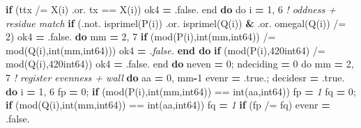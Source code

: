 \documentclass[10pt]{article}
\renewcommand{\_}{\origunderscore\allowbreak}
\newenvironment{Shaded}{}{}
\newcommand{\BuiltInTok}[1]{#1}
\newcommand{\CommentTok}[1]{\textit{#1}}
\newcommand{\ConstantTok}[1]{#1}
\newcommand{\DecValTok}[1]{#1}
\newcommand{\KeywordTok}[1]{\textbf{#1}}
\newcommand{\NormalTok}[1]{#1}
\newcommand{\OperatorTok}[1]{#1}
\begin{document}
\begin{Shaded}
\begin{Highlighting}[]
        \KeywordTok{if}\NormalTok{ (ttx }\OperatorTok{/=}\NormalTok{ X(i) }\OperatorTok{.or.}\NormalTok{ tx }\OperatorTok{==}\NormalTok{ X(i)) ok4 }\KeywordTok{=} \ConstantTok{.false.}
\BuiltInTok{     e}\NormalTok{nd }\KeywordTok{do}
\BuiltInTok{     d}\NormalTok{o i }\KeywordTok{=} \DecValTok{1}\NormalTok{, }\DecValTok{6}                                   \CommentTok{! oddness + residue match}
        \KeywordTok{if}\NormalTok{ (}\OperatorTok{.not.}\NormalTok{ isprime\_l(P(i)) }\OperatorTok{.or.}\NormalTok{ isprime\_l(Q(i)) }\KeywordTok{\&}
             \OperatorTok{.or.}\NormalTok{ omega\_l(Q(i)) }\OperatorTok{/=} \DecValTok{2}\NormalTok{) ok4 }\KeywordTok{=} \ConstantTok{.false.}
        \KeywordTok{do}\NormalTok{ mm }\KeywordTok{=} \DecValTok{2}\NormalTok{, }\DecValTok{7}
           \KeywordTok{if}\NormalTok{ (}\BuiltInTok{mod}\NormalTok{(P(i),}\BuiltInTok{int}\NormalTok{(mm,int64)) }\OperatorTok{/=} \BuiltInTok{mod}\NormalTok{(Q(i),}\BuiltInTok{int}\NormalTok{(mm,int64))) ok4 }\KeywordTok{=}\CommentTok{ .false.}
        \KeywordTok{end do}
        \KeywordTok{if}\NormalTok{ (}\BuiltInTok{mod}\NormalTok{(P(i),}\DecValTok{420\_int64}\NormalTok{) }\OperatorTok{/=} \BuiltInTok{mod}\NormalTok{(Q(i),}\DecValTok{420\_int64}\NormalTok{)) ok4 }\KeywordTok{=} \ConstantTok{.false.}
\BuiltInTok{     e}\NormalTok{nd }\KeywordTok{do}
\BuiltInTok{     n}\NormalTok{\_even }\KeywordTok{=} \DecValTok{0}\NormalTok{; n\_deciding }\KeywordTok{=} \DecValTok{0}
\BuiltInTok{     d}\NormalTok{o mm }\KeywordTok{=} \DecValTok{2}\NormalTok{, }\DecValTok{7}                                  \CommentTok{! register evenness + wall}
        \KeywordTok{do}\NormalTok{ aa }\KeywordTok{=} \DecValTok{0}\NormalTok{, mm}\KeywordTok{{-}}\DecValTok{1}
\NormalTok{           even\_r }\KeywordTok{=} \ConstantTok{.true.}\NormalTok{; decides\_r }\KeywordTok{=} \ConstantTok{.true.}
           \KeywordTok{do}\NormalTok{ i }\KeywordTok{=} \DecValTok{1}\NormalTok{, }\DecValTok{6}
\NormalTok{              fp }\KeywordTok{=} \DecValTok{0}\NormalTok{; }\KeywordTok{if}\NormalTok{ (}\BuiltInTok{mod}\NormalTok{(P(i),}\BuiltInTok{int}\NormalTok{(mm,int64)) }\OperatorTok{==} \BuiltInTok{int}\NormalTok{(aa,int64)) fp }\KeywordTok{=}\CommentTok{ 1}
\NormalTok{              fq }\KeywordTok{=} \DecValTok{0}\NormalTok{; }\KeywordTok{if}\NormalTok{ (}\BuiltInTok{mod}\NormalTok{(Q(i),}\BuiltInTok{int}\NormalTok{(mm,int64)) }\OperatorTok{==} \BuiltInTok{int}\NormalTok{(aa,int64)) fq }\KeywordTok{=}\CommentTok{ 1}
              \KeywordTok{if}\NormalTok{ (fp }\OperatorTok{/=}\NormalTok{ fq) even\_r }\KeywordTok{=} \ConstantTok{.false.}

\end{Highlighting}
\end{Shaded}
\end{document}
